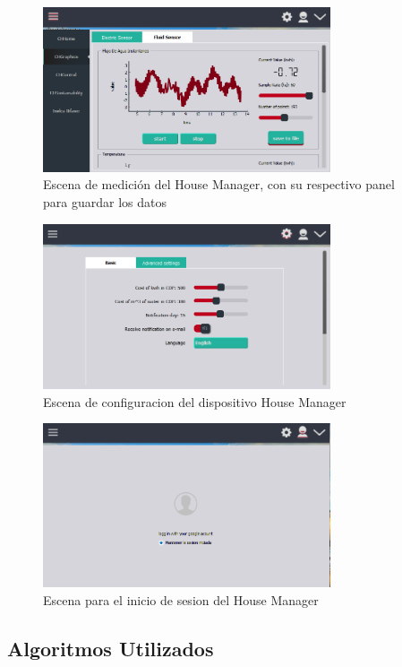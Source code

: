 \begin{figure}[htbp]
	\centerline{\includegraphics[width=8.5cm]{figuras/housemanager_measure.png}}
	\caption{Escena de medición del House Manager, con su respectivo panel para guardar los datos}
	\label{fig_9}
\end{figure}
 
 \begin{figure}[htbp]
 	\centerline{\includegraphics[width=8.5cm]{figuras/housemanager_config.png}}
 	\caption{Escena de configuracion del dispositivo House Manager}
 	\label{fig_10}
 \end{figure}
 
 \begin{figure}[htbp]
 	\centerline{\includegraphics[width=8.5cm]{figuras/housemanager_user.png}}
 	\caption{Escena para el inicio de sesion del House Manager}
 	\label{fig_11}
 \end{figure}

 \subsection{Algoritmos Utilizados}
 
